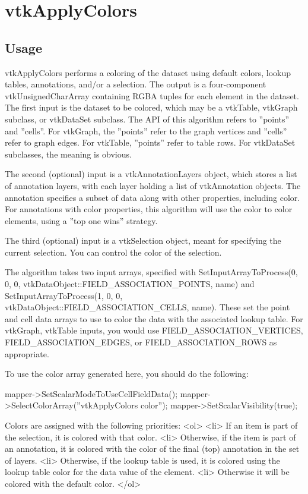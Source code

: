 \section{vtkApplyColors}

\subsection{Usage}

 vtkApplyColors performs a coloring of the dataset using default colors,
 lookup tables, annotations, and/or a selection. The output is a
 four-component vtkUnsignedCharArray containing RGBA tuples for each
 element in the dataset. The first input is the dataset to be colored, which
 may be a vtkTable, vtkGraph subclass, or vtkDataSet subclass. The API
 of this algorithm refers to ''points'' and ''cells''. For vtkGraph, the
 ''points'' refer to the graph vertices and ''cells'' refer to graph edges.
 For vtkTable, ''points'' refer to table rows. For vtkDataSet subclasses, the
 meaning is obvious.

 The second (optional) input is a vtkAnnotationLayers object, which stores
 a list of annotation layers, with each layer holding a list of
 vtkAnnotation objects. The annotation specifies a subset of data along with
 other properties, including color. For annotations with color properties,
 this algorithm will use the color to color elements, using a ''top one wins''
 strategy.

 The third (optional) input is a vtkSelection object, meant for specifying
 the current selection. You can control the color of the selection.

 The algorithm takes two input arrays, specified with
 SetInputArrayToProcess(0, 0, 0, vtkDataObject::FIELD\_ASSOCIATION\_POINTS, name)
 and
 SetInputArrayToProcess(1, 0, 0, vtkDataObject::FIELD\_ASSOCIATION\_CELLS, name).
 These set the point and cell data arrays to use to color the data with
 the associated lookup table. For vtkGraph, vtkTable inputs, you would use
 FIELD\_ASSOCIATION\_VERTICES, FIELD\_ASSOCIATION\_EDGES, or
 FIELD\_ASSOCIATION\_ROWS as appropriate.

 To use the color array generated here, you should do the following:

  mapper->SetScalarModeToUseCellFieldData();
  mapper->SelectColorArray(''vtkApplyColors color'');
  mapper->SetScalarVisibility(true);

 Colors are assigned with the following priorities:
 <ol>
 <li> If an item is part of the selection, it is colored with that color.
 <li> Otherwise, if the item is part of an annotation, it is colored
      with the color of the final (top) annotation in the set of layers.
 <li> Otherwise, if the lookup table is used, it is colored using the
      lookup table color for the data value of the element.
 <li> Otherwise it will be colored with the default color.
 </ol>

